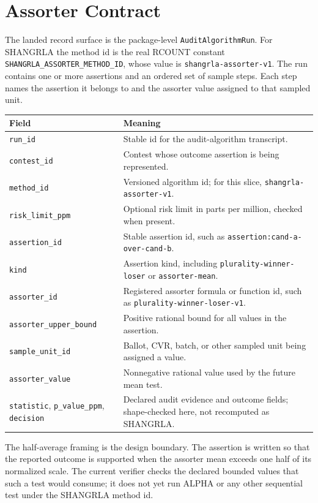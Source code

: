 \section{Assorter Contract}

The landed record surface is the package-level \texttt{AuditAlgorithmRun}. For
SHANGRLA the method id is the real RCOUNT constant
\texttt{SHANGRLA\_ASSORTER\_METHOD\_ID}, whose value is
\texttt{shangrla-assorter-v1}. The run contains one or more assertions and an
ordered set of sample steps. Each step names the assertion it belongs to and the
assorter value assigned to that sampled unit.

\begin{center}
\small
\begin{tabularx}{\textwidth}{lX}
\toprule
Field & Meaning \\
\midrule
\texttt{run\_id} & Stable id for the audit-algorithm transcript. \\
\texttt{contest\_id} & Contest whose outcome assertion is being represented. \\
\texttt{method\_id} & Versioned algorithm id; for this slice, \texttt{shangrla-assorter-v1}. \\
\texttt{risk\_limit\_ppm} & Optional risk limit in parts per million, checked when present. \\
\texttt{assertion\_id} & Stable assertion id, such as \texttt{assertion:cand-a-over-cand-b}. \\
\texttt{kind} & Assertion kind, including \texttt{plurality-winner-loser} or \texttt{assorter-mean}. \\
\texttt{assorter\_id} & Registered assorter formula or function id, such as \texttt{plurality-winner-loser-v1}. \\
\texttt{assorter\_upper\_bound} & Positive rational bound for all values in the assertion. \\
\texttt{sample\_unit\_id} & Ballot, CVR, batch, or other sampled unit being assigned a value. \\
\texttt{assorter\_value} & Nonnegative rational value used by the future mean test. \\
\texttt{statistic}, \texttt{p\_value\_ppm}, \texttt{decision} & Declared audit evidence and outcome fields; shape-checked here, not recomputed as SHANGRLA. \\
\bottomrule
\end{tabularx}
\end{center}

The half-average framing is the design boundary. The assertion is written so
that the reported outcome is supported when the assorter mean exceeds one half
of its normalized scale. The current verifier checks the declared bounded values
that such a test would consume; it does not yet run ALPHA or any other
sequential test under the SHANGRLA method id.
